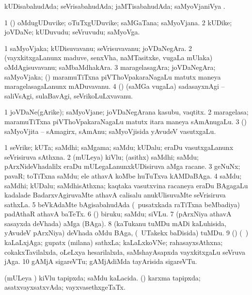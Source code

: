 \bentry
{}
\gl{\gu}
\bmng
kUDisabahudAda; seVrisabahudAda; jaMTisabahudAda; saMyoVjaniVya 
\emng
. \eentry

\bentry
{}
\gl{\nA}
\bmng
\bnum
\num{1} (\nAyxshA) oMdugUDuvike; oTuTxgUDuvike; saMGaTana; saMyoVjana. 
\num{2} kUDike; joVDaNe; kUDuvudu; seVruvudu; saMyoVga. 
\enum
\emng
\eentry

\bentry
{}
\gl{\nA}
\bmng
\bnum
\num{1} saMyoVjaka; kUDisuvavanu; seVrisuvavanu; joVDaNegAra. 
\num{2} (vayxkitxgaLanunx maduve, senxVha, naMTasitxke, \mo vugaLa mUlaka) oMdAgisuvavanu; saMbaMdhakAra. 
\num{3} maragelasagAra; joVDaNegAra; saMyoVjaka; (\kanmu) maramuTiTxna piVThoVpakaraNagaLu matutx maneya maragelasagaLanunx mADuvavanu. 
\num{4} (\AmA) (saMGa \mo vugaLa) sadasayxnAgi -- saliVsAgi, sulaBavAgi, seVrikoLuLxvavanu. 
\enum
\emng
\eentry

\bentry
{}
\gl{\nA}
\bmng
\bnum
\num{1} joVDaNe(gArike); saMyoVjane; joVDaNegArana kasubu, vaqtitx. 
\num{2} maragelasa; maramuTiTxna piVThoVpakaraNagaLu matutx itara maneya sAmAnugaLu. 
\num{3} (\rUpa) saMyoVjita -- sAmagirx, sAmAnu; saMyoVjisida yAvudeV vasutxgaLu. 
\enum
\emng
\eentry

\bentry
{}
\gl{\nA}
\bmng
\bnum
\num{1} seVrike; kUTa; saMdhi; saMgama; saMdu; kUDalu; eraDu vasutxgaLanunx seVrisiruva sAthxna. 
\num{2} (mULeya) kiVlu; (asithx) saMdhi; saMdu; pArxNideVhadalilx eraDu mULegaLanunxkUDisiruva aMga racane. 
\num{3} geNuNx; pavaR; toTiTxna saMdu; ele athavA koMbe huTuTxva kAMDaBAga. 
\num{4} saMdu; saMdhi; kUDalu; saMdhisAthxna; kaqtaka vasutxvina racaneya eraDu BAgagaLu kadalade BadarxvAgiruvaMte athavA calisalu anukUlisuvaMte seVrisiruva sathxLa. 
\num{5} beVkAdaMte bAgisabahudAda (\kanmu\ pusatxkada raTiTxna beMbadiya) padAthaR athavA baTeTx. 
\num{6} (\BUvi) biruku; saMdu; siVLu. 
\num{7} (pArxNiya athavA sasayxda deVhada) aMga (BAga). 
\num{8} (kaTukanu tuMDu mADi kaLuhisida, yAvudeV pArxNiya) deVhada oMdu BAga, (\kanmu\ UTakekx baDisida) tuMDu. 
\num{9} (\ashi) (\kanmu\ \ame) kaLaLxjAga; gupatx (milana) sathxLa; kaLaLxkoVNe; rahasayxsAthxna; cokakxTavilalxda, oLeLxya hesarilalxda, saMshayAsapxda vayxkitxgaLu seVruva jAga. 
\num{10} gAMjA sigareVTu; gAMjAdiMda tayArisida sigareVTu. 
\enum
\emng

\noindent
\gl{\pagu}
\bmng
{} 
\banum
{} (mULeya \vi) kiVlu tapipxda; saMdu kaLacida. 
 (\rUpa) karxma tapipxda; asatxvayxsatxvAda; vayxvasethxgeTaTx. 
\eanum
\emng


